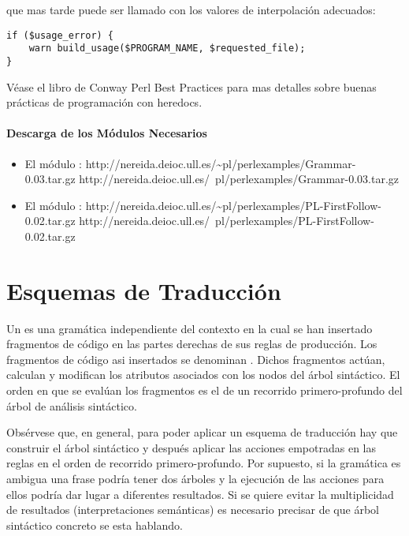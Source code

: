 que mas tarde puede ser llamado con los valores de interpolación adecuados:

\begin{verbatim}
if ($usage_error) {
    warn build_usage($PROGRAM_NAME, $requested_file);
}
\end{verbatim}
Véase  el libro de Conway  Perl Best Practices
\cite{bestpractices}
para mas detalles sobre buenas prácticas de programación con heredocs.

\paragraph{Descarga de los Módulos Necesarios}
\begin{itemize}
\item
El módulo : 
\htmladdnormallink
{http://nereida.deioc.ull.es/\~{}pl/perlexamples/Grammar-0.03.tar.gz}
{http://nereida.deioc.ull.es/~pl/perlexamples/Grammar-0.03.tar.gz}

\item
El módulo :
\htmladdnormallink
{http://nereida.deioc.ull.es/\~{}pl/perlexamples/PL-FirstFollow-0.02.tar.gz}
{http://nereida.deioc.ull.es/~pl/perlexamples/PL-FirstFollow-0.02.tar.gz}
\end{itemize}

\section{Esquemas de Traducción}
\label{section:esquemas}
\begin{definition}
Un  es una gramática independiente del contexto
en la cual se han insertado fragmentos de código en las partes derechas
de sus reglas de producción. Los fragmentos de código asi insertados 
se denominan . Dichos fragmentos actúan, calculan
y modifican los atributos asociados con los nodos del árbol sintáctico. 
El orden en que se evalúan los fragmentos
es el de un recorrido primero-profundo del árbol de análisis sintáctico.
\end{definition}
Obsérvese que, en general, para poder aplicar un esquema de traducción hay 
que construir el árbol sintáctico y después aplicar las acciones empotradas
en las reglas en el orden de recorrido primero-profundo. Por supuesto, si 
la gramática es ambigua una frase podría tener dos árboles y la ejecución de las
acciones para ellos podría dar lugar a diferentes resultados. Si se quiere
evitar la multiplicidad de resultados (interpretaciones semánticas)
es necesario precisar de que árbol sintáctico concreto se esta hablando.

